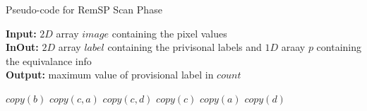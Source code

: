 \clearpage
\begin{algorithm}[h]
\small
{
	\caption{Pseudo-code for RemSP Scan Phase}
	\label{alg:RemSP-I}
	\textbf{Input:} $2D$ array $image$ containing the pixel values \\
	\textbf{InOut:} $2D$ array $label$ containing the privisonal labels and $1D$ araay $p$ containing the equivalance info\\
	\textbf{Output:} maximum value of provisional label in $count$
	\begin{algorithmic}[1]
						\State $copy(b)$
					\Else
								\State $copy(c,a)$
							\Else
									\State $copy(c,d)$
								\Else
									\State $copy(c)$
								\EndIf
							\EndIf
						\Else
								\State $copy(a)$
							\Else
									\State $copy(d)$
								\Else
								\EndIf
							\EndIf
						\EndIf
					\EndIf
				\EndIf
			\EndFor
		\EndFor
		\State {}
	\EndFunction
	\end{algorithmic}
}	
\end{algorithm}

